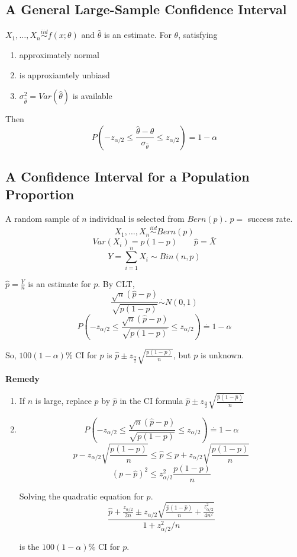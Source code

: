 \subsection{A General Large-Sample Confidence Interval}
$X_1,\dots,X_n \overset{iid}{\sim} f(x;\theta)$ and $\hat{\theta}$ is an estimate.
For $\theta$, satisfying 
\begin{enumerate}
\item approximately normal 
\item is approxiamtely unbiasd
\item $\sigma_{\hat{\theta}}^2=Var(\hat{\theta})$ is available
\end{enumerate}

Then
\[P\left(-z_{\alpha/2} \leq \frac{\hat{\theta}-\theta}{\sigma_{\hat{\theta}}}  \leq  z_{\alpha/2} \right) = 1-\alpha\]

\subsection{A Confidence Interval for a Population Proportion}
\begin{exmp}
A random sample of $n$ individual is selected from $Bern(p)$. $p=$ success rate.
\[X_1,\dots,X_n \overset{iid}{\sim} Bern(p)\]
\[\boxed{Var(X_i)=p(1-p)  \qquad \hat{p}=\bar{X}}\]
\[Y=\sum_{i=1}^n X_i \sim Bin(n,p)\]

$\hat{p}=\frac{Y}{n}$ is an estimate for $p$. By CLT,
\[\frac{\sqrt{n}(\hat{p}-p)}{\sqrt{p(1-p)}} \overset{\cdot}{\sim} N(0,1)\]
\[P\left(-z_{\alpha/2} \leq \frac{\sqrt{n}(\hat{p}-p)}{\sqrt{p(1-p)}}  \leq  z_{\alpha/2} \right) \overset{\cdot}{=} 1-\alpha\]

So, $100(1-\alpha)\%$ CI for $p$ is $\hat{p} \pm  z_{\frac{\alpha}{2}} \sqrt{\frac{p(1-p)}{n}}$, but $p$ is unknown.
\end{exmp}

\textbf{Remedy}
\begin{enumerate}
\item If $n$ is large, replace $p$ by $\hat{p}$ in the CI formula
$\hat{p} \pm  z_{\frac{\alpha}{2}} \sqrt{\frac{\hat{p}(1-\hat{p})}{n}}$
\item 
\[P\left(-z_{\alpha/2} \leq \frac{\sqrt{n}(\hat{p}-p)}{\sqrt{p(1-p)}}  \leq  z_{\alpha/2} \right) \overset{\cdot}{=} 1-\alpha\]
\[p-z_{\alpha/2}\sqrt{\frac{p(1-p)}{n}} \leq\hat{p}\leq p+z_{\alpha/2}\sqrt{\frac{p(1-p)}{n}} \]
\[(p-\hat{p})^2 \leq z_{\alpha/2}^2 \frac{p(1-p)}{n} \]

Solving the quadratic equation for $p$.
\[\frac{\hat{p}+\frac{z_{\alpha/2}}{2n} \pm z_{\alpha/2}\sqrt{\frac{\hat{p}(1-\hat{p})}{n}+\frac{z_{\alpha/2}^2}{4n^2}}}{1+z_{\alpha/2}^2 /n}\]

is the $100(1-\alpha)\%$ CI for $p$.
\end{enumerate}

